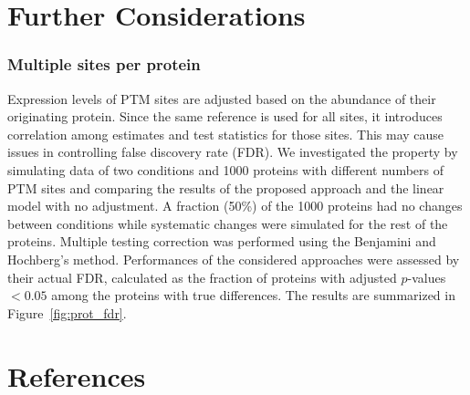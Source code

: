 \documentclass{mcp}
\def\sfigref#1{{Figure~\ref{#1}}}
\begin{document}
\section{Further Considerations}

\subsubsection{Multiple sites per protein}

Expression levels of PTM sites are adjusted based on the abundance of their originating protein. Since the same reference is used for all sites, it introduces correlation among estimates and test statistics for those sites. This may cause issues in controlling false discovery rate (FDR).
We investigated the property by simulating data of two conditions and 1000 proteins with different numbers of PTM sites and comparing the results of the proposed approach and the linear model with no adjustment. 
A fraction (50\%) of the 1000 proteins had no changes between conditions while systematic changes were simulated for the rest of the proteins. Multiple testing correction was performed using the Benjamini and Hochberg's method. 
Performances of the considered approaches were assessed by their actual FDR, calculated as the fraction of proteins with adjusted $p$-values $<0.05$ among the proteins with true differences. The results are summarized in \sfigref{fig:prot_fdr}.

\clearpage
\section*{References}



\end{document}
